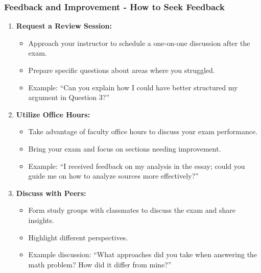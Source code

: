 \documentclass[aspectratio=169]{beamer}
\begin{document}
\begin{frame}[fragile]
    \frametitle{Feedback and Improvement - How to Seek Feedback}
    \begin{enumerate}
        \item \textbf{Request a Review Session:}
        \begin{itemize}
            \item Approach your instructor to schedule a one-on-one discussion after the exam.
            \item Prepare specific questions about areas where you struggled. 
            \item Example: “Can you explain how I could have better structured my argument in Question 3?”
        \end{itemize}
        
        \item \textbf{Utilize Office Hours:}
        \begin{itemize}
            \item Take advantage of faculty office hours to discuss your exam performance.
            \item Bring your exam and focus on sections needing improvement.
            \item Example: “I received feedback on my analysis in the essay; could you guide me on how to analyze sources more effectively?”
        \end{itemize}
        
        \item \textbf{Discuss with Peers:}
        \begin{itemize}
            \item Form study groups with classmates to discuss the exam and share insights.
            \item Highlight different perspectives.
            \item Example discussion: “What approaches did you take when answering the math problem? How did it differ from mine?”
        \end{itemize}
    \end{enumerate}
\end{frame}
\end{document}
